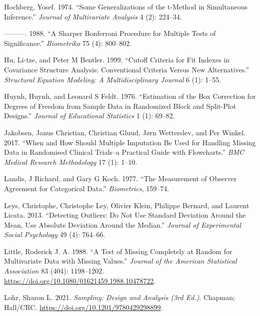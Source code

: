 \documentclass[
  letterpaper,
]{krantz}
\newlength{\cslhangindent}
\newenvironment{CSLReferences}[2] %
 {\begin{list}{}{%
  \setlength{\itemindent}{0pt}
  \setlength{\leftmargin}{0pt}
  \setlength{\parsep}{0pt}
  \ifodd #1
   \setlength{\leftmargin}{\cslhangindent}
   \setlength{\itemindent}{-1\cslhangindent}
  \fi
  \setlength{\itemsep}{#2\baselineskip}}}
 {\end{list}}
\begin{document}
\begin{CSLReferences}{1}{0}
Hochberg, Yosef. 1974. {``Some Generalizations of the t-Method in
Simultaneous Inference.''} \emph{Journal of Multivariate Analysis} 4
(2): 224--34.

---------. 1988. {``A Sharper Bonferroni Procedure for Multiple Tests of
Significance.''} \emph{Biometrika} 75 (4): 800--802.

Hu, Li-tze, and Peter M Bentler. 1999. {``Cutoff Criteria for Fit
Indexes in Covariance Structure Analysis: Conventional Criteria Versus
New Alternatives.''} \emph{Structural Equation Modeling: A
Multidisciplinary Journal} 6 (1): 1--55.

Huynh, Huynh, and Leonard S Feldt. 1976. {``Estimation of the Box
Correction for Degrees of Freedom from Sample Data in Randomized Block
and Split-Plot Designs.''} \emph{Journal of Educational Statistics} 1
(1): 69--82.

Jakobsen, Janus Christian, Christian Gluud, Jørn Wetterslev, and Per
Winkel. 2017. {``When and How Should Multiple Imputation Be Used for
Handling Missing Data in Randomised Clinical Trials--a Practical Guide
with Flowcharts.''} \emph{BMC Medical Research Methodology} 17 (1):
1--10.

Landis, J Richard, and Gary G Koch. 1977. {``The Measurement of Observer
Agreement for Categorical Data.''} \emph{Biometrics}, 159--74.

Leys, Christophe, Christophe Ley, Olivier Klein, Philippe Bernard, and
Laurent Licata. 2013. {``Detecting Outliers: Do Not Use Standard
Deviation Around the Mean, Use Absolute Deviation Around the Median.''}
\emph{Journal of Experimental Social Psychology} 49 (4): 764--66.

Little, Roderick J. A. 1988. {``A Test of Missing Completely at Random
for Multivariate Data with Missing Values.''} \emph{Journal of the
American Statistical Association} 83 (404): 1198--1202.
\url{https://doi.org/10.1080/01621459.1988.10478722}.

Lohr, Sharon L. 2021. \emph{Sampling: Design and Analysis (3rd Ed.)}.
Chapman; Hall/CRC. \url{https://doi.org/10.1201/9780429298899}.


\end{CSLReferences}
\end{document}
